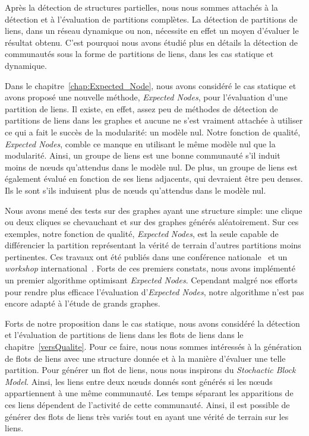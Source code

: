 Après la détection de structures partielles, nous nous sommes attachés à la détection et à l'évaluation de partitions complètes.
La détection de partitions de liens, dans un réseau dynamique ou non, nécessite en effet un moyen d'évaluer le résultat obtenu.
C'est pourquoi nous avons étudié plus en détails la détection de communautés sous la forme de partitions de liens, dans les cas statique et dynamique.


Dans le chapitre~\ref{chap:Expected_Node}, nous avons considéré le cas statique et avons proposé une nouvelle méthode, \emph{Expected Nodes}, pour l'évaluation d'une partition de liens.
Il existe, en effet, assez peu de méthodes de détection de partitions de liens dans les graphes et aucune ne s'est vraiment attachée à utiliser ce qui a fait le succès de la modularité: un modèle nul.
Notre fonction de qualité, \emph{Expected Nodes}, comble ce manque en utilisant le même modèle nul que la modularité.
Ainsi, un groupe de liens est une bonne communauté s'il induit moins de n\oe{}uds qu'attendus dans le modèle nul.
De plus, un groupe de liens est également évalué en fonction de ses liens adjacents, qui devraient être peu denses.
Ils le sont s'ils induisent plus de n\oe{}uds qu'attendus dans le modèle nul.

Nous avons mené des tests sur des graphes ayant une structure simple: une clique ou deux cliques se chevauchant et sur des graphes générés aléatoirement.
Sur ces exemples, notre fonction de qualité, \emph{Expected} \emph{Nodes}, est la seule capable de différencier la partition représentant la vérité de terrain d'autres partitions moins pertinentes.
Ces travaux ont été publiés dans une conférence nationale~\cite{Gaumont2014} et un \emph{workshop} international~\cite{Gaumont2015}.
Forts de ces premiers constats, nous avons implémenté un premier algorithme optimisant \emph{Expected Nodes}.
Cependant malgré nos efforts pour rendre plus efficace l'évaluation d'\emph{Expected Nodes}, notre algorithme n'est pas encore adapté à l'étude de grands graphes.

\bigskip

Forts de notre proposition dans le cas statique, nous avons considéré la détection et l'évaluation de partitions de liens dans les flots de liens dans le chapitre~\ref{versQualite}.
Pour ce faire, nous nous sommes intéressés à la génération de flots de liens avec une structure donnée et à la manière d'évaluer une telle partition.
Pour générer un flot de liens, nous nous inspirons du \emph{Stochactic Block Model}.
Ainsi, les liens entre deux n\oe{}uds donnés sont générés si les n\oe{}uds appartiennent à une même communauté.
Les temps séparant les apparitions de ces liens dépendent de l'activité de cette communauté.
Ainsi, il est possible de générer des flots de liens très variés tout en ayant une vérité de terrain sur les liens.

